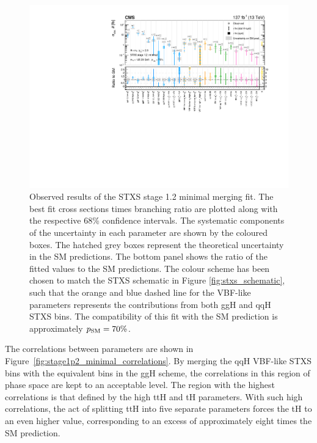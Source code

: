 \begin{figure}[htbp]
  \centering
  \includegraphics[width=1\textwidth]{Figures/hgg_results/stage1p2_minimal_summary.pdf}
  \caption[Results of the STXS stage 1.2 minimal merging fit]
  {
    Observed results of the STXS stage 1.2 minimal merging fit. The best fit cross sections times branching ratio are plotted along with the respective 68\% confidence intervals. The systematic components of the uncertainty in each parameter are shown by the coloured boxes. The hatched grey boxes represent the theoretical uncertainty in the SM predictions. The bottom panel shows the ratio of the fitted values to the SM predictions. The colour scheme has been chosen to match the STXS schematic in Figure \ref{fig:stxs_schematic}, such that the orange and blue dashed line for the VBF-like parameters represents the contributions from both ggH and qqH STXS bins. The compatibility of this fit with the SM prediction is approximately $p_{\rm{SM}}=70\%$. 
  }
  \label{fig:stage1p2_minimal_results}
\end{figure}

The correlations between parameters are shown in Figure~\ref{fig:stage1p2_minimal_correlations}. By merging the qqH VBF-like STXS bins with the equivalent bins in the ggH scheme, the correlations in this region of phase space are kept to an acceptable level. The region with the highest correlations is that defined by the high \ptH ttH and tH parameters. With such high correlations, the act of splitting ttH into five separate parameters forces the tH \xsbr to an even higher value, corresponding to an excess of approximately eight times the SM prediction. 

